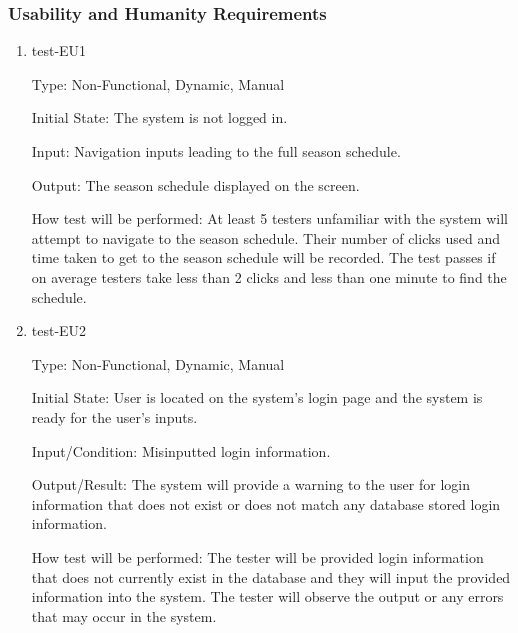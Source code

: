\documentclass[12pt, titlepage]{article}
\begin{document}
\subsubsection{Usability and Humanity Requirements}

\begin{enumerate}

  \item{test-EU1\\}

  Type: Non-Functional, Dynamic, Manual

  Initial State: The system is not logged in.

  Input: Navigation inputs leading to the full season schedule.

  Output: The season schedule displayed on the screen.

  How test will be performed: At least 5 testers unfamiliar with the system will
  attempt to navigate to the season schedule. Their number of clicks used and
  time taken to get to the season schedule will be recorded. The test passes
  if on average testers take less than 2 clicks and less than one minute to
  find the schedule.

  \item{test-EU2\\}

  Type: Non-Functional, Dynamic, Manual

  Initial State: User is located on the system's login page and the system is ready
  for the user's inputs.

  Input/Condition: Misinputted login information.

  Output/Result: The system will provide a warning to the user for login information that
  does not exist or does not match any database stored login information.

  How test will be performed: The tester will be provided login information that does not
  currently exist in the database and they will input the provided information into the
  system. The tester will observe the output or any errors that may occur in the system.

  
            
            
            

\end{enumerate}
\end{document}
